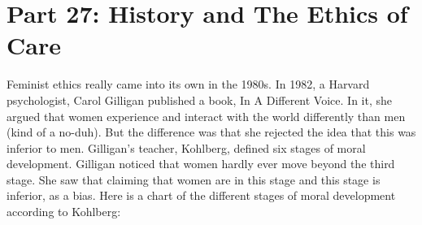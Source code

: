 \chapter{Part 27: History and The Ethics of Care}

Feminist ethics really came into its own in the 1980s. In 1982, a Harvard psychologist, Carol Gilligan published a book, In A Different Voice. In it, she argued that women experience and interact with the world differently than men (kind of a no-duh). But the difference was that she rejected the idea that this was inferior to men. Gilligan’s teacher, Kohlberg, defined six stages of moral development. Gilligan noticed that women hardly ever move beyond the third stage. She saw that claiming that women are in this stage and this stage is inferior, as a bias. Here is a chart of the different stages of moral development according to Kohlberg:
\noindent
